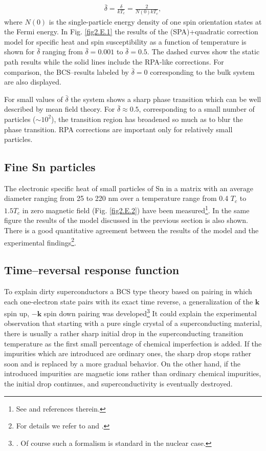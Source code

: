 \begin{subappendices}
  \begin{align}
  \bar{\delta}=\frac{\delta}{kT_c}=\frac{2}{N(0)kT_c},
  \end{align}
where $N(0)$ is the single-particle energy density of one spin orientation states at the Fermi energy. In Fig. \ref{fig2.E.1} the results of the (SPA)+quadratic correction model for specific heat and spin susceptibility as a function of temperature is shown for $\bar{\delta}$ ranging from $\bar\delta=0.001$ to $\bar{\delta}=0.5$. The dashed curves show the static path results while the solid lines include the RPA-like corrections. For comparison, the BCS--results labeled by $\bar\delta=0$ corresponding to the bulk system are also displayed.


For small values of $\bar\delta$ the system shows a sharp phase transition which can be well described by mean field theory. For $\bar\delta\approx0.5$, corresponding to a small number of particles ($\sim10^2$), the transition region has broadened so much as to blur the phase transition. RPA corrections are important only for relatively small particles.
\subsection{Fine Sn particles}
The electronic specific heat of small particles of Sn in a matrix with an average diameter ranging from 25 to 220 nm over a temperature range from 0.4 $T_c$ to $1.5T_c$ in zero magnetic field (Fig. \ref{fig2.E.2}) have been measured\footnote{See \cite{Perenboom:81} and references therein.}. In the same figure the results of the model discussed in the previous section is also shown.
There is a good quantitative agreement between the results of the model and the experimental findings\footnote{For details we refer to \cite{Lauritzen:93} and \cite{Muhlschlegel:72}.}.
 \subsection{Time--reversal response function}
 To explain dirty superconductors a BCS type theory based on pairing in which each one-electron state pairs with its exact time reverse, a generalization of the $\mathbf k$ spin up, $-\mathbf k$ spin down pairing was developed\footnote{\cite{Anderson:59}. Of course such a formalism is standard in the nuclear case.} It could explain the experimental observation that starting with a pure single crystal of a superconducting material, there is usually a rather sharp initial drop in the superconducting transition temperature as the first small percentage of chemical imperfection is added. If the impurities which are introduced are ordinary ones, the sharp drop stops rather soon and is replaced by a more gradual behavior. On the other hand, if the introduced impurities are magnetic ions rather than ordinary chemical impurities, the initial drop continues, and superconductivity is eventually destroyed.
 

\end{subappendices}
